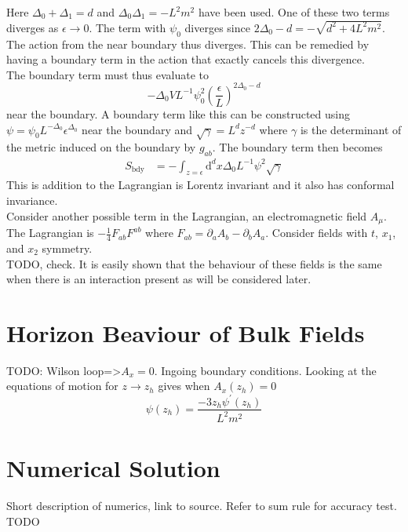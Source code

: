 \documentclass[12pt]{report}
\renewcommand{\d}{\ensuremath{\mathrm{d}}}
\newcommand{\At}{\ensuremath{{A_x}}}
\begin{document}
Here $\Delta_0+\Delta_1=d$ and $\Delta_0\Delta_1=-L^2m^2$ have been used. One of these two terms diverges as $\epsilon\rightarrow0$. The term with $\psi_0$ diverges since $2\Delta_0-d=-\sqrt{d^2+4L^2m^2}$. The action from the near boundary thus diverges. This can be remedied by having a boundary term in the action that exactly cancels this divergence.\\
The boundary term must thus evaluate to
\begin{equation}
-\Delta_0VL^{-1}\psi_0^2\left(\frac{\epsilon}{L}\right)^{2\Delta_0-d}
\end{equation}
near the boundary. A boundary term like this can be constructed using $\psi=\psi_0L^{-\Delta_0}\epsilon^{\Delta_0}$ near the boundary and $\sqrt{\gamma}=L^dz^{-d}$ where $\gamma$ is the determinant of the metric induced on the boundary by $g_{ab}$.
The boundary term then becomes
\begin{equation}
\begin{split}
 S_{\mathrm{bdy}}&=-\int_{z=\epsilon}\d^dx\Delta_0L^{-1}\psi^2\sqrt{\gamma}
\label{Sbdy}
\end{split}
\end{equation}
This is addition to the Lagrangian is Lorentz invariant and it also has conformal invariance.
\\
Consider another possible term in the Lagrangian, an electromagnetic field $A_\mu$. The Lagrangian is $-\frac{1}{4}F_{ab}F^{ab}$ where $F_{ab}=\partial_aA_b-\partial_bA_a$. Consider fields with $t$, $x_1$, and $x_2$ symmetry.
\\
TODO, check. It is easily shown that the behaviour of these fields is the same when there is an interaction present as will be considered later.
\section{Horizon Beaviour of Bulk Fields}
TODO: Wilson loop=>$\At=0$. Ingoing boundary conditions.
Looking at the equations of motion for $z\rightarrow z_h$ gives when $\At(z_h)=0$
\begin{equation}
 \psi(z_h)=\frac{-3z_h\psi^\prime(z_h)}{L^2m^2}
\end{equation}
\section{Numerical Solution}
Short description of numerics, link to source. Refer to sum rule for accuracy test. TODO
\end{document}
